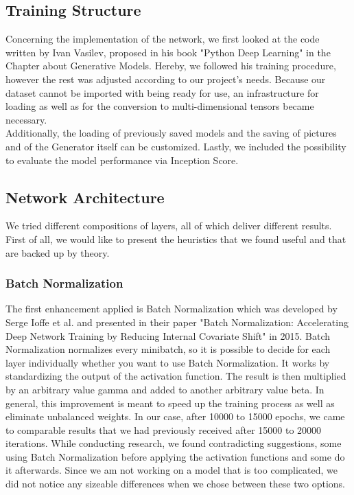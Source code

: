     \subsection{Training Structure}
    Concerning the implementation of the network, we first looked at the code written by Ivan Vasilev, proposed in his book "Python Deep Learning" \cite{PythonDeepLearning} in the Chapter about Generative Models. Hereby, we followed his training procedure, however the rest was adjusted according to our project's needs. Because our dataset cannot be imported with being ready for use, an infrastructure for loading as well as for the conversion to multi-dimensional tensors became necessary.\\
    Additionally, the loading of previously saved models and the saving of pictures and of the Generator itself can be customized. Lastly, we included the possibility to evaluate the model performance via Inception Score.
    
    \subsection{Network Architecture}
    We tried different compositions of layers, all of which deliver different results. First of all, we would like to present the heuristics that we found useful and that are backed up by theory. \\
    
    \subsubsection{Batch Normalization}
    The first enhancement applied is Batch Normalization which was developed by Serge Ioffe et al. and presented in their paper "Batch Normalization: Accelerating Deep Network Training by Reducing Internal Covariate Shift" \cite{ioffe2015batch} in 2015. Batch Normalization normalizes every minibatch, so it is possible to decide for each layer individually whether you want to use Batch Normalization. It works by standardizing the output of the activation function. The result is then multiplied by an arbitrary value gamma and added to another arbitrary value beta. In general, this improvement is meant to speed up the training process as well as eliminate unbalanced weights. In our case, after 10000 to 15000 epochs, we came to comparable results that we had previously received after 15000 to 20000 iterations. While conducting research, we found contradicting suggestions, some using Batch Normalization before applying the activation functions and some do it afterwards. Since we am not working on a model that is too complicated, we did not notice any sizeable differences when we chose between these two options.
    \\
